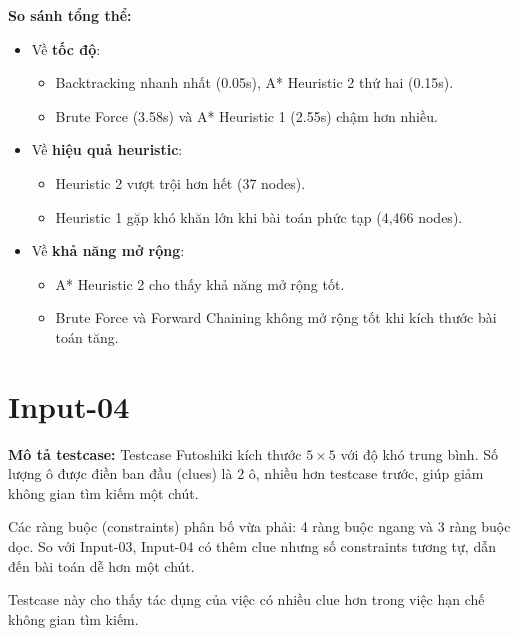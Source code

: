 \textbf{So sánh tổng thể:}

\begin{itemize}
    \item Về \textbf{tốc độ}:
    \begin{itemize}
        \item Backtracking nhanh nhất (0.05s), A* Heuristic 2 thứ hai (0.15s).
        \item Brute Force (3.58s) và A* Heuristic 1 (2.55s) chậm hơn nhiều.
    \end{itemize}
    
    \item Về \textbf{hiệu quả heuristic}:
    \begin{itemize}
        \item Heuristic 2 vượt trội hơn hết (37 nodes).
        \item Heuristic 1 gặp khó khăn lớn khi bài toán phức tạp (4,466 nodes).
    \end{itemize}
    
    \item Về \textbf{khả năng mở rộng}:
    \begin{itemize}
        \item A* Heuristic 2 cho thấy khả năng mở rộng tốt.
        \item Brute Force và Forward Chaining không mở rộng tốt khi kích thước bài toán tăng.
    \end{itemize}
\end{itemize}


\section{Input-04}
\textbf{Mô tả testcase:}
Testcase Futoshiki kích thước $5 \times 5$ với độ khó trung bình. Số lượng ô được điền ban đầu (clues) là 2 ô, nhiều hơn testcase trước, giúp giảm không gian tìm kiếm một chút.

Các ràng buộc (constraints) phân bố vừa phải: 4 ràng buộc ngang và 3 ràng buộc dọc. So với Input-03, Input-04 có thêm clue nhưng số constraints tương tự, dẫn đến bài toán dễ hơn một chút.

Testcase này cho thấy tác dụng của việc có nhiều clue hơn trong việc hạn chế không gian tìm kiếm.

